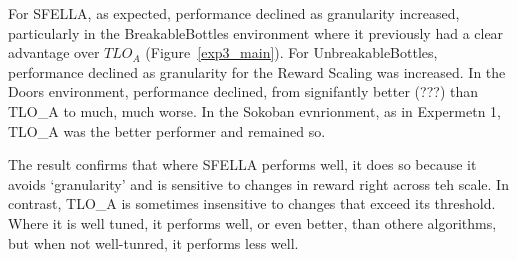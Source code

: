 \begin{figure}
  \caption{
  }
   \label{fig:exp3_main}
 \end{figure}
 
For SFELLA, as expected, performance declined as granularity increased, particularly in the BreakableBottles environment where it previously had a clear advantage over $TLO_A$ (Figure~\ref{exp3_main}). For UnbreakableBottles, performance declined as granularity for the Reward Scaling was increased. In the Doors environment, performance declined, from signifantly better (???) than TLO_A to much, much worse. In the Sokoban evnrionment, as in Expermetn 1, TLO_A was the better performer and remained so.

The result confirms that where SFELLA performs well, it does so because it avoids `granularity' and is sensitive to changes in reward right across teh scale. In contrast, TLO_A is sometimes insensitive to changes that exceed its threshold. Where it is well tuned, it performs well, or even better, than othere algorithms, but when not well-tunred, it performs less well.



